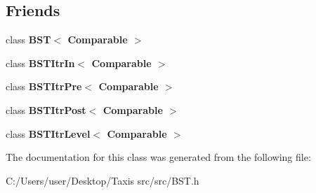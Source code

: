 \subsection*{Friends}
\begin{DoxyCompactItemize}
\item 
\mbox{\label{class_binary_node_a28a1adb9906f3ff7e12c2cb6fa2bd54e}} 
class {\bfseries B\+S\+T$<$ Comparable $>$}
\item 
\mbox{\label{class_binary_node_aab3993acac2ab24a0b59edb0c3acc775}} 
class {\bfseries B\+S\+T\+Itr\+In$<$ Comparable $>$}
\item 
\mbox{\label{class_binary_node_a45a55df6f11541416d4ea7684c575c1a}} 
class {\bfseries B\+S\+T\+Itr\+Pre$<$ Comparable $>$}
\item 
\mbox{\label{class_binary_node_a5dc153694be266f6e772659486219da7}} 
class {\bfseries B\+S\+T\+Itr\+Post$<$ Comparable $>$}
\item 
\mbox{\label{class_binary_node_a26ff00bc0d87069aed877f10fd3c80a8}} 
class {\bfseries B\+S\+T\+Itr\+Level$<$ Comparable $>$}
\end{DoxyCompactItemize}


The documentation for this class was generated from the following file\+:\begin{DoxyCompactItemize}
\item 
C\+:/\+Users/user/\+Desktop/\+Taxis src/src/B\+S\+T.\+h\end{DoxyCompactItemize}
